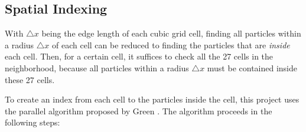 \subsection{Spatial Indexing}
\label{subsection spatial indexing}
With $\triangle x$ being the edge length of each cubic grid cell, finding all particles within a radius $\triangle x$ of each cell can be reduced to finding the particles that are \textit{inside} each cell. Then, for a certain cell, it suffices to check all the 27 cells in the neighborhood, because all particles within a radius $\triangle x$ must be contained inside these 27 cells. 


To create an index from each cell to the particles inside the cell, this project uses the parallel algorithm proposed by Green \cite{harlow1965numerical}. The algorithm proceeds in the following steps:

